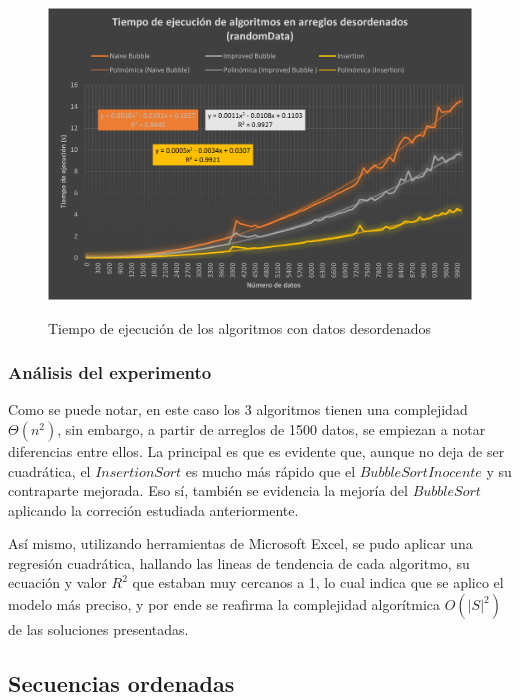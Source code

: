 \documentclass[letter]{article}
\begin{document}
\begin{figure}[h]
    \centering
    \includegraphics[scale=0.76]{randomDataGraphic.png}
    \label{experimentos:aleatorias:grafica}
    \caption{Tiempo de ejecución de los algoritmos con datos desordenados}
\end{figure}

\subsubsection{Análisis del experimento}
\label{experimentos:aleatorias:analisis}
Como se puede notar, en este caso los 3 algoritmos tienen una complejidad $\Theta(n^{2})$, sin embargo, a partir de arreglos de 1500 datos, se empiezan a notar diferencias entre ellos. La principal es que es evidente que, aunque no deja de ser cuadrática, el $Insertion Sort$ es mucho más rápido que el $Bubble Sort Inocente$ y su contraparte mejorada. Eso sí, también se evidencia la mejoría del $Bubble Sort$ aplicando la correción estudiada anteriormente.

Así mismo, utilizando herramientas de Microsoft Excel, se pudo aplicar una regresión cuadrática, hallando las lineas de tendencia de cada algoritmo, su ecuación y valor $R^{2}$ que estaban muy cercanos a 1, lo cual indica que se aplico el modelo más preciso, y por ende se reafirma la complejidad algorítmica $O(|S|^2)$ de las soluciones presentadas.

\subsection{Secuencias ordenadas} \label{experimentos:ordenadas}
\end{document}
